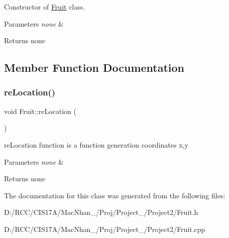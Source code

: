 Constructor of \hyperlink{class_fruit}{Fruit} class. 


\begin{DoxyParams}{Parameters}
{\em none} & \\
\hline
\end{DoxyParams}
\begin{DoxyReturn}{Returns}
none 
\end{DoxyReturn}


\subsection{Member Function Documentation}
\mbox{\label{class_fruit_a1fdcbedbadc7809aceaffd4164754c25}} 
\subsubsection{\texorpdfstring{re\+Location()}{reLocation()}}
{\footnotesize\ttfamily void Fruit\+::re\+Location (\begin{DoxyParamCaption}{ }\end{DoxyParamCaption})}



re\+Location function is a function generation coordinates x,y 


\begin{DoxyParams}{Parameters}
{\em none} & \\
\hline
\end{DoxyParams}
\begin{DoxyReturn}{Returns}
none 
\end{DoxyReturn}


The documentation for this class was generated from the following files\+:\begin{DoxyCompactItemize}
\item 
D\+:/\+R\+C\+C/\+C\+I\+S17\+A/\+Mac\+Nhan\+\_/\+Proj/\+Project\+\_/\+Project2/Fruit.\+h\item 
D\+:/\+R\+C\+C/\+C\+I\+S17\+A/\+Mac\+Nhan\+\_/\+Proj/\+Project\+\_/\+Project2/Fruit.\+cpp\end{DoxyCompactItemize}
